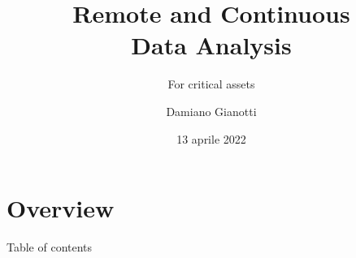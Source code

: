 \documentclass[UKenglish, dvipsnames]{beamer}
\author[Damiano Gianotti]{Damiano Gianotti}
\title{Remote and Continuous\\ Data Analysis}
\subtitle{For critical assets}
\date{13 aprile 2022}
\begin{document}
\section{Overview}
\begin{frame}{Table of contents}
    \tableofcontents[currentsection]
\end{frame}






% 
% 



% 
\end{document}

